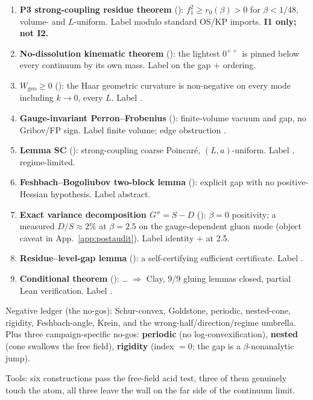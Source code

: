 \begin{enumerate}
\item \textbf{P3 strong-coupling residue theorem} ():
  $f_1^2\ge r_0(\beta)>0$ for $\beta<1/48$, volume- and $L$-uniform. Label \LT{} modulo standard
  OS/KP imports. \textbf{I1 only; not I2.}
\item \textbf{No-dissolution kinematic theorem} (): the
  lightest $0^{++}$ is pinned below every continuum by its own mass. Label \LC{} on the gap $+$
  ordering.
\item \textbf{$W_{\mathrm{geo}}\ge0$} (): the Haar geometric
  curvature is non-negative on every mode including $k\to0$, every $L$. Label \LT.
\item \textbf{Gauge-invariant Perron--Frobenius} ():
  finite-volume vacuum and gap, no Gribov/FP sign. Label \LT{} finite volume; edge obstruction
  \LN.
\item \textbf{Lemma SC} (): strong-coupling coarse Poincaré,
  $(L,a)$-uniform. Label \LT, regime-limited.
\item \textbf{Feshbach--Bogoliubov two-block lemma} (): explicit gap with no
  positive-Hessian hypothesis. Label \LT{} abstract.
\item \textbf{Exact variance decomposition $G''=S-D$} ():
  $\beta=0$ positivity; a measured $D/S\approx2\%$ at $\beta=2.5$ on the gauge-dependent gluon mode (object caveat in App.~\ref{app:postaudit}). Label \LT{} identity $+$ \LM{} at 2.5.
\item \textbf{Residue--level-gap lemma} (): a self-certifying sufficient
  certificate. Label \LT.
\item \textbf{Conditional theorem} ():  \ldots{}
   $\Rightarrow$ Clay, 9/9 gluing lemmas closed, partial Lean verification. Label
  \LC.
\end{enumerate}

Negative ledger (the no-gos): Schur-convex, Goldstone, periodic, nested-cone, rigidity,
Feshbach-angle, Krein, and the wrong-half/direction/regime umbrella. Plus three campaign-specific
no-gos: \textbf{periodic} (no log-convexification), \textbf{nested} (cone swallows the free
field), \textbf{rigidity} (index $=0$; the gap is a $\beta$-nonanalytic jump).

Tools: six constructions pass the free-field acid test, three of them genuinely touch the atom,
all three leave the wall on the far side of the continuum limit.

